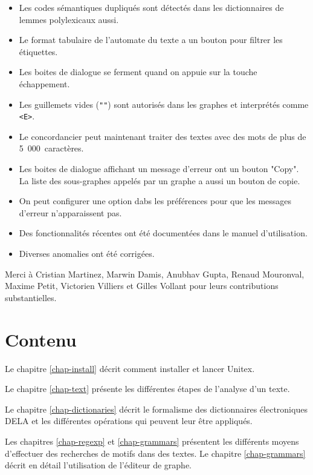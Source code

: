 \begin{itemize}
  \item Les codes sémantiques dupliqués sont détectés dans les dictionnaires de lemmes polylexicaux
  aussi.
  \item Le format tabulaire de l'automate du texte a un bouton pour filtrer les étiquettes.
  \item Les boites de dialogue se ferment quand on appuie sur la touche échappement.
  \item Les guillemets vides (\verb$""$) sont autorisés dans les graphes et interprétés comme
  \verb$<E>$.
  \item Le concordancier peut maintenant traiter des textes avec des mots de plus de
  5~000~caractères.
  \item Les boites de dialogue affichant un message d'erreur ont un bouton "Copy". La liste des
  sous-graphes appelés par un graphe a aussi un bouton de copie.
  \item On peut configurer une option dabs les préférences pour que les messages d'erreur
  n'apparaissent pas.
  \item Des fonctionnalités récentes ont été documentées dans le manuel d'utilisation.
  \item Diverses anomalies ont été corrigées. 
\end{itemize}

\noindent Merci à Cristian Martinez, Marwin Damis, Anubhav Gupta, Renaud Mouronval,
Maxime Petit, Victorien Villiers et Gilles Vollant pour leurs contributions substantielles.

\clearpage

\section*{Contenu}
\noindent Le chapitre \ref{chap-install} décrit comment installer et lancer Unitex.

\bigskip \noindent Le chapitre \ref{chap-text} présente les différentes étapes de l'analyse d'un
texte.

\bigskip \noindent Le chapitre \ref{chap-dictionaries} décrit le formalisme 
des dictionnaires électroniques DELA et les différentes opérations qui peuvent leur être appliqués.

\bigskip \noindent Les chapitres \ref{chap-regexp} et \ref{chap-grammars}
présentent les différents moyens d’effectuer des recherches de motifs dans des textes.
Le chapitre \ref{chap-grammars} décrit en détail l'utilisation de l'éditeur de graphe.

